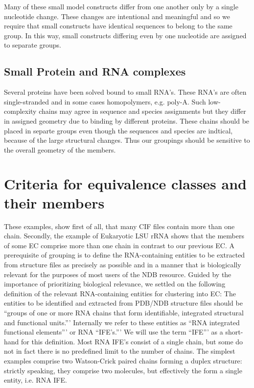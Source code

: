 Many of these small model constructs differ from one another only by a single
nucleotide change. These changes are intentional and meaningful and so we
require that small constructs have identical sequences to belong to the same
group. In this way, small constructs differing even by one nucleotide are
assigned to separate groups.

\subsection{Small Protein and RNA complexes}

Several proteins have been solved bound to  small RNA's. These RNA's are often
single-stranded and in some cases homopolymers, e.g. poly-A. Such low-complexity
chains may agree in sequence and species assignments but they differ in assigned
geometry due to binding by different proteins. These chains should be placed in
separte groups even though the sequences and species are indtical, because of
the large structural changes. Thus our groupings should be sensitive to the
overall geometry of the members.

\section{Criteria for equivalence classes and their members}

These examples, show first of all, that many CIF files contain more than one
chain. Secondly, the example of Eukaryotic LSU rRNA shows that the members of
some EC comprise more than one chain in contrast to our previous EC. A
prerequisite of grouping is to define the RNA-containing entities to be
extracted from structure files as precisely as possible and in a manner that is
biologically relevant for the purposes of most users of the NDB resource. Guided
by the importance of prioritizing biological relevance, we settled on the
following definition of the relevant RNA-containing entities for clustering into
EC: The entities to be identified and extracted from PDB/NDB structure files
should be ``groups of one or more RNA chains that form identifiable, integrated
structural and functional units.''' Internally we refer to these entities as
``RNA integrated functional elements''' or RNA ``IFE's.''' We will use the term
``IFE''' as a short-hand for this definition.  Most RNA IFE's consist of a single
chain, but some do not in fact there is no predefined limit to the number of
chains. The simplest examples comprise two Watson-Crick paired chains
forming a duplex structure: strictly speaking, they comprise two molecules, but
effectively the form a single entity, i.e. RNA IFE.

